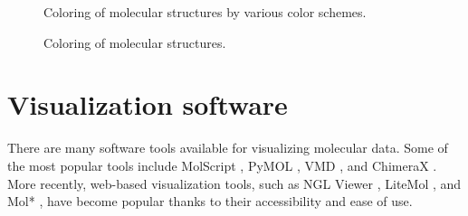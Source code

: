 \documentclass[
  digital,     %
  oneside,     %
  nosansbold,  %
  nocolorbold, %
  lof,         %
  lot,         %
]{fithesis4}
\begin{document}
\begin{figure}[htbp]
  \centering
  \caption{Coloring of molecular structures.}{Coloring of molecular structures by various color schemes.}
  \label{fig:coloring}
\end{figure}

\section{Visualization software}
\label{section:visualization_software}

There are many software tools available for visualizing molecular data. Some of the most popular tools include MolScript \cite{kraulis1991molscript}, PyMOL \cite{delano2002pymol}, VMD \cite{humphrey1996vmd}, and ChimeraX \cite{goddard2018ucsf}. More recently, web-based visualization tools, such as NGL Viewer \cite{rose2015ngl}, LiteMol \cite{sehnal2017litemol}, and Mol* \cite{sehnal2021molstar}, have become popular thanks to their accessibility and ease of use.
\end{document}
